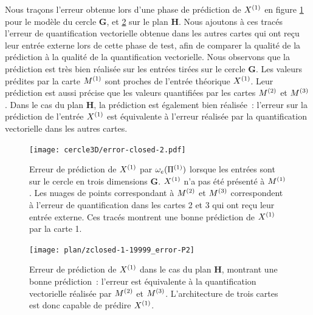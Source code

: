 \documentclass[../main]{subfiles}
\begin{document}
Nous traçons l'erreur obtenue lors d'une phase de prédiction de $X^{({1})}$ en figure \ref{fig:pred_cercle} pour le modèle du cercle \textbf{G}, et \ref{fig:plan3_pred} sur le plan \textbf{H}.
Nous ajoutons à ces tracés l'erreur de quantification vectorielle obtenue dans les autres cartes qui ont reçu leur entrée externe lors de cette phase de test, afin de comparer la qualité de la prédiction à la qualité de la quantification vectorielle.
Nous observons que la prédiction est très bien réalisée sur les entrées tirées sur le cercle \textbf{G}. Les valeurs prédites par la carte $M^{({1})}$ sont proches de l'entrée théorique $X^{({1})}$. Leur prédiction est aussi précise que les valeurs quantifiées par les cartes $M^{({2})}$ et $M^{({3})}$.
Dans le cas du plan \textbf{H}, la prédiction est également bien réalisée~: l'erreur sur la prédiction de l'entrée $X^{({1})}$ est équivalente à l'erreur réalisée par la quantification vectorielle dans les autres cartes.

\begin{figure}
	\texttt{[image: cercle3D/error-closed-2.pdf]}
	\caption{Erreur de prédiction de $X^{({1})}$ par $\omega_e(\Pi^{({1})})$ lorsque les entrées sont sur le cercle en trois dimensions \textbf{G}. $X^{({1})}$ n'a pas été présenté à $M^{({1})}$.
	Les nuages de points correspondant à $M^{({2})}$ et $M^{({3})}$ correspondent à l'erreur de quantification dans les cartes 2 et 3 qui ont reçu leur entrée externe. Ces tracés montrent une bonne prédiction de $X^{({1})}$ par la carte 1. \label{fig:pred_cercle}}
\end{figure}

\begin{figure}
	\texttt{[image: plan/zclosed-1-19999\_error-P2]}	
	\caption{Erreur de prédiction de $X^{({1})}$ dans le cas du plan \textbf{H}, montrant une bonne prédiction~: l'erreur est équivalente à la quantification vectorielle réalisée par $M^{({2})}$ et $M^{({3})}$. L'architecture de trois cartes est donc capable de prédire $X^{({1})}$. 
	\label{fig:plan3_pred}}
\end{figure}
\end{document}
